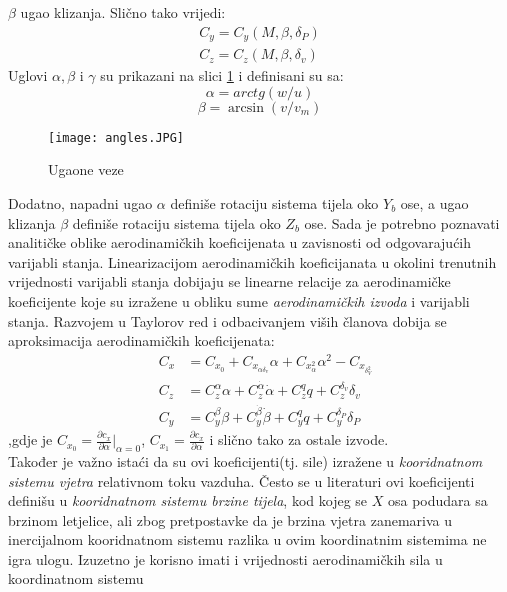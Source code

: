 $\beta$ ugao klizanja. Slično tako vrijedi:
\begin{eqnarray}
    C_y=C_y(M,\beta,\delta_P)\\
    C_z=C_z(M,\beta,\delta_v)
\end{eqnarray}
Uglovi $\alpha, \beta$ i $\gamma$ su prikazani na slici \ref{fig:angles} i definisani su sa:
\begin{equation}
    \alpha=arctg(w/u)
\end{equation}
\begin{equation}
    \beta=\arcsin(v/v_m)
\end{equation}
\begin{figure}[ht!]
    \centering
    \texttt{[image: angles.JPG]}
    \caption{Ugaone veze}
    \label{fig:angles}
\end{figure}
Dodatno, napadni ugao $\alpha$ definiše rotaciju sistema tijela oko $Y_b$ ose, a ugao klizanja 
$\beta$ definiše rotaciju sistema tijela oko $Z_b$ ose. 
Sada je potrebno poznavati analitičke oblike aerodinamičkih koeficijenata u zavisnosti 
od odgovarajućih varijabli stanja. Linearizacijom aerodinamičkih koeficijanata u okolini trenutnih vrijednosti 
varijabli stanja dobijaju se linearne relacije za aerodinamičke koeficijente koje su 
izražene u obliku sume \textit{aerodinamičkih izvoda} i varijabli stanja.
Razvojem u Taylorov red i odbacivanjem viših članova dobija se aproksimacija 
aerodinamičkih koeficijenata:
\begin{eqnarray}
    &C_x&=C_{x_0}+C_{x_{\alpha\delta _v}}\alpha+C_{x_\alpha^2}\alpha^2-C_{x_{\delta _V^2}}\\
   &C_z&=C_z^{\alpha}{\alpha} + C_z^{\dot{\alpha}} \dot{\alpha}+C_z^q q+C_z^{\delta _v}{\delta _v}\\
    &C_y&=C_y^{\beta}{\beta} + C_y^{\dot{\beta}} \dot{\beta}+C_y^q q+C_y^{\delta _P}{\delta _P}
\end{eqnarray}
,gdje je $C_{x_0}=\frac{\partial c_x}{\partial \alpha}|_{\alpha=0}$, $C_{x_1}=\frac{\partial c_x}{\partial \alpha}$ 
i slično tako za ostale izvode.\\
Također je važno istaći da su ovi koeficijenti(tj. sile) izražene u \textit{kooridnatnom sistemu vjetra} 
relativnom toku vazduha. Često se u literaturi ovi koeficijenti definišu u \textit{kooridnatnom sistemu brzine tijela}, kod kojeg se $X$ osa podudara sa 
brzinom letjelice, ali zbog pretpostavke da je brzina vjetra zanemariva u inercijalnom kooridnatnom sistemu razlika 
u ovim koordinatnim sistemima ne igra ulogu. 
Izuzetno je korisno imati i vrijednosti aerodinamičkih sila u koordinatnom sistemu 
